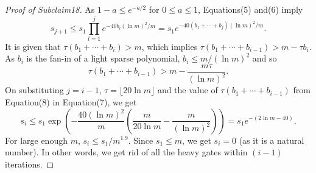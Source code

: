 \documentclass[10pt,a4paper]{article}
\begin{document}
\begin{proof}[Proof of Subclaim18]
As $1-a\le e^{-a/2}$ for $0\le a\le1$, Equations(5) and(6) imply
\begin{equation}
s_{j+1}\le s_1\prod_{l=1}^je^{-40b_l(\ln m)^2/m}
=s_1e^{-40(b_1+\cdots+b_j)(\ln m)^2/m}.\tag{7}
\end{equation}
It is given that $\tau(b_1+\cdots+b_i)>m$, which implies $\tau(b_1+\cdots+b_{i-1})>m-\tau b_i$. As $b_i$ is the fan-in of a light sparse polynomial, $b_i\le m/(\ln m)^2$ and so
\begin{equation}
\tau(b_1+\cdots+b_{i-1})>m-\frac{m\tau}{(\ln m)^2}.\tag{8}
\end{equation}
On substituting $j=i-1$, $\tau=\lfloor20\ln m\rfloor$ and the value of $\tau(b_1+\cdots+b_{i-1})$ from Equation(8) in Equation(7), we get
\[
s_i\le s_1\exp\left(-\frac{40(\ln m)^2}{m}
\left(\frac m{20\ln m}-\frac m{(\ln m)^2}\right)\right)
=s_1e^{-(2\ln m-40)}.
\]
For large enough $m$, $s_i\le s_1/m^{1.9}$. Since $s_1\le m$, we get $s_i=0$ (as it is a natural number). In other words, we get rid of all the heavy gates within $(i-1)$ iterations.
\end{proof}
\end{document}
